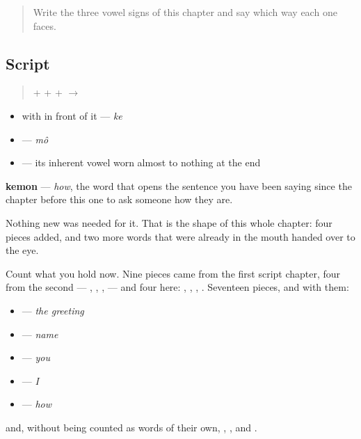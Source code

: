 \label{lesson:BN-W02-kemon-read}



\begin{quote}
Write the three vowel signs of this chapter and say which way each one faces.
\end{quote}

\subsection*{Script}
\begin{quote}
\textbf{} + \textbf{} + \textbf{} + \textbf{} $\to$ \textbf{}
\end{quote}

\begin{itemize}
\raggedright
  \item \textbf{} with \textbf{} in front of it — \emph{ke}
  \item \textbf{} — \emph{mô}
  \item \textbf{} — its inherent vowel worn almost to nothing at the end
\end{itemize}

\textbf{kemon} — \emph{how}, the word that opens the sentence you have been saying since the chapter before this one to ask someone how they are.

Nothing new was needed for it. That is the shape of this whole chapter: four pieces added, and two more words that were already in the mouth handed over to the eye.

Count what you hold now. Nine pieces came from the first script chapter, four from the second — \textbf{}, \textbf{}, \textbf{}, \textbf{} — and four here: \textbf{}, \textbf{}, \textbf{}, \textbf{}. Seventeen pieces, and with them:

\begin{itemize}
\raggedright
  \item \textbf{} — \emph{the greeting}
  \item \textbf{} — \emph{name}
  \item \textbf{} — \emph{you}
  \item \textbf{} — \emph{I}
  \item \textbf{} — \emph{how}
\end{itemize}

and, without being counted as words of their own, \textbf{}, \textbf{}, \textbf{} and \textbf{}.

